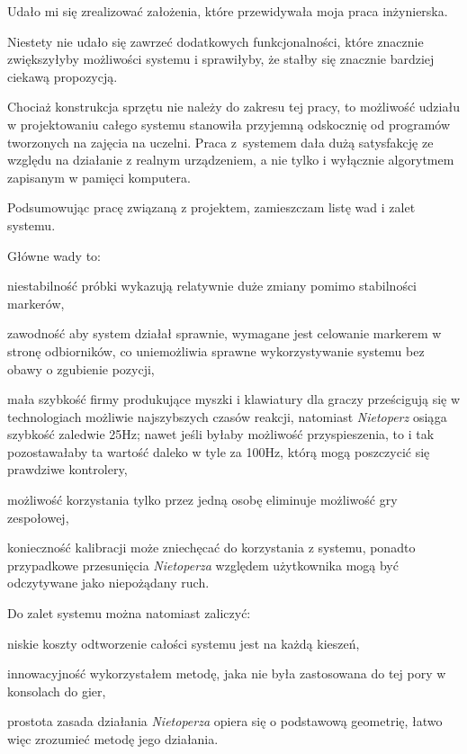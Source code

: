 \label{ch:conclusion}

Udało mi się zrealizować założenia, które przewidywała moja praca inżynierska.

Niestety nie udało się zawrzeć dodatkowych funkcjonalności, które znacznie zwiększyłyby możliwości systemu i sprawiłyby, że stałby się znacznie bardziej ciekawą propozycją.

Chociaż konstrukcja sprzętu nie należy do zakresu tej pracy, to możliwość udziału w projektowaniu całego systemu stanowiła przyjemną odskocznię od programów tworzonych na zajęcia na uczelni. Praca z~systemem dała dużą satysfakcję ze względu na działanie z realnym urządzeniem, a nie tylko i wyłącznie algorytmem zapisanym w pamięci komputera.


Podsumowując pracę związaną z projektem, zamieszczam listę wad i zalet systemu.

Główne wady to:
\begin{aenumerate}
 \item niestabilność \ppauza próbki wykazują relatywnie duże zmiany pomimo stabilności markerów,
 \item zawodność \ppauza aby system działał sprawnie, wymagane jest celowanie markerem w stronę odbiorników, co uniemożliwia sprawne wykorzystywanie systemu bez obawy o zgubienie pozycji,
 \item mała szybkość \ppauza firmy produkujące myszki i klawiatury dla graczy prześcigują się w technologiach możliwie najszybszych czasów reakcji, natomiast \textsl{Nietoperz} osiąga szybkość zaledwie 25Hz; nawet jeśli byłaby możliwość przyspieszenia, to i tak pozostawałaby ta wartość daleko w tyle za 100Hz, którą mogą poszczycić się prawdziwe kontrolery,
 \item możliwość korzystania tylko przez jedną osobę \ppauza eliminuje możliwość gry zespołowej,
 \item konieczność kalibracji \ppauza może zniechęcać do korzystania z systemu, ponadto przypadkowe przesunięcia \textsl{Nietoperza} względem użytkownika mogą być odczytywane jako niepożądany ruch.
\end{aenumerate}

Do zalet systemu można natomiast zaliczyć:
\begin{aenumerate}
 \item niskie koszty \ppauza odtworzenie całości systemu jest na każdą kieszeń,
 \item innowacyjność \ppauza wykorzystałem metodę, jaka nie była zastosowana do tej pory w konsolach do gier,
 \item prostota \ppauza zasada działania \textsl{Nietoperza} opiera się o podstawową geometrię, łatwo więc zrozumieć metodę jego działania.
\end{aenumerate}

